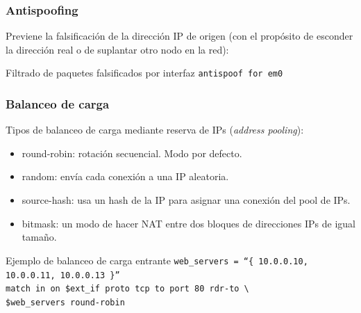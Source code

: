 \documentclass{beamer}
\begin{document}

\begin{frame}
\frametitle{Antispoofing}

Previene la \alert{falsificación} de la dirección IP de origen (con el propósito de esconder la dirección real o de suplantar otro nodo en la red):

\begin{block}{Filtrado de paquetes falsificados por interfaz}
\tt antispoof for em0
\end{block}

\end{frame}


\begin{frame}
\frametitle{Balanceo de carga}

Tipos de balanceo de carga mediante reserva de IPs (\textit{address pooling}):

\begin{itemize}
\item \alert{round-robin}: rotación secuencial. Modo por defecto. 
\item \alert{random}: envía cada conexión a una IP aleatoria.
\item \alert{source-hash}: usa un hash de la IP para asignar una conexión del pool de IPs.  
\item \alert{bitmask}: un modo de hacer NAT entre dos bloques de direcciones IPs de igual tamaño.
\end{itemize} 

\begin{block}{Ejemplo de balanceo de carga entrante}
\small
\tt web\_servers = ``\{ 10.0.0.10, 10.0.0.11, 10.0.0.13 \}'' \\
match in on \$ext\_if proto tcp to port 80 rdr-to \textbackslash \\
\hspace{7mm} \$web\_servers \alert{round-robin} 
\end{block}

\end{frame}


\end{document}
